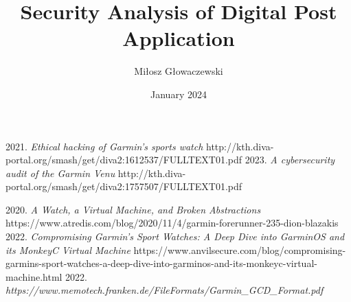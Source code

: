 \documentclass{article}
\title{Security Analysis of Digital Post Application}
\author{Miłosz Głowaczewski}
\date{January 2024}
\begin{document}
    \maketitle

    
    
    
    
    
    
    
    

    \begin{thebibliography}{99}
         2021. \textit{Ethical hacking of Garmin’s sports watch} http://kth.diva-portal.org/smash/get/diva2:1612537/FULLTEXT01.pdf
         2023. \textit{A cybersecurity audit of the Garmin Venu} http://kth.diva-portal.org/smash/get/diva2:1757507/FULLTEXT01.pdf

         2020. \textit{A Watch, a Virtual Machine, and Broken Abstractions} https://www.atredis.com/blog/2020/11/4/garmin-forerunner-235-dion-blazakis
         2022. \textit{Compromising Garmin’s Sport Watches: A Deep Dive into GarminOS and its MonkeyC Virtual Machine} https://www.anvilsecure.com/blog/compromising-garmins-sport-watches-a-deep-dive-into-garminos-and-its-monkeyc-virtual-machine.html
         2022. \textit{https://www.memotech.franken.de/FileFormats/Garmin\_GCD\_Format.pdf}
    \end{thebibliography}
\end{document}
